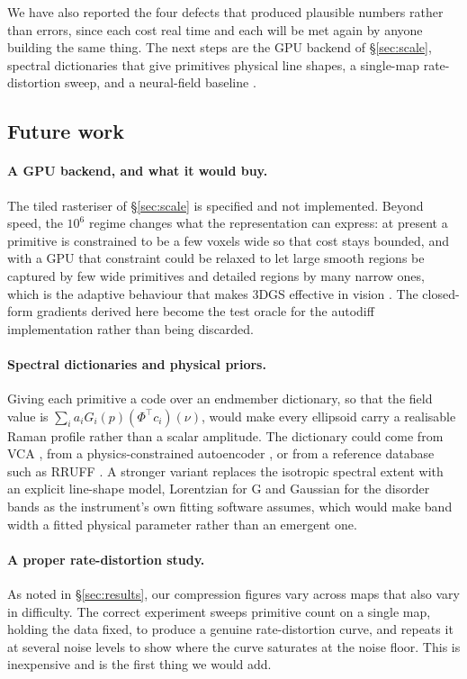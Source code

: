 We have also reported the four defects that produced plausible numbers rather
than errors, since each cost real time and each will be met again by anyone
building the same thing. The next steps are the GPU backend of
\S\ref{sec:scale}, spectral dictionaries that give primitives physical line
shapes, a single-map rate-distortion sweep, and a neural-field baseline
\cite{mildenhall2021nerf}.



\subsection{Future work}
\label{sec:future}

\paragraph{A GPU backend, and what it would buy.}
The tiled rasteriser of \S\ref{sec:scale} is specified and not implemented.
Beyond speed, the $10^6$ regime changes what the representation can express: at
present a primitive is constrained to be a few voxels wide so that cost stays
bounded, and with a GPU that constraint could be relaxed to let large smooth
regions be captured by few wide primitives and detailed regions by many narrow
ones, which is the adaptive behaviour that makes 3DGS effective in vision
\cite{kerbl20233dgs}. The closed-form gradients derived here become the test
oracle for the autodiff implementation rather than being discarded.

\paragraph{Spectral dictionaries and physical priors.}
Giving each primitive a code over an endmember dictionary, so that the field
value is $\sum_i a_i G_i(p)(\Phi^\top c_i)(\nu)$, would make every ellipsoid
carry a realisable Raman profile rather than a scalar amplitude. The dictionary
could come from VCA \cite{nascimento2005vca}, from a physics-constrained
autoencoder \cite{georgiev2024unmixing}, or from a reference database such as
RRUFF \cite{lafuente2015power}. A stronger variant replaces the isotropic
spectral extent with an explicit line-shape model, Lorentzian for G and
Gaussian for the disorder bands as the instrument's own fitting software
assumes, which would make band width a fitted physical parameter rather than an
emergent one.

\paragraph{A proper rate-distortion study.}
As noted in \S\ref{sec:results}, our compression figures vary across maps that
also vary in difficulty. The correct experiment sweeps primitive count on a
single map, holding the data fixed, to produce a genuine rate-distortion curve,
and repeats it at several noise levels to show where the curve saturates at the
noise floor. This is inexpensive and is the first thing we would add.


